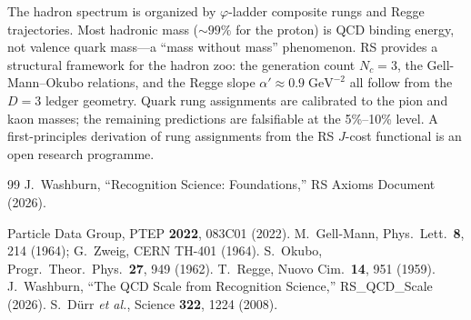 \documentclass[12pt,a4paper]{article}
\theoremstyle{definition}
\theoremstyle{remark}
\begin{document}
The hadron spectrum is organized by $\varphi$-ladder composite rungs
and Regge trajectories.  Most hadronic mass ($\sim 99\%$ for the
proton) is QCD binding energy, not valence quark mass---a ``mass
without mass'' phenomenon.  RS provides a structural framework for the
hadron zoo: the generation count $N_c = 3$, the Gell-Mann--Okubo
relations, and the Regge slope $\alpha' \approx 0.9\;\mathrm{GeV}^{-2}$
all follow from the $D = 3$ ledger geometry.  Quark rung assignments
are calibrated to the pion and kaon masses; the remaining predictions
are falsifiable at the 5\%--10\% level.  A first-principles derivation
of rung assignments from the RS $J$-cost functional is an open
research programme.

\begin{thebibliography}{99}
J.~Washburn, ``Recognition Science: Foundations,''
RS Axioms Document (2026).

 Particle Data Group, PTEP \textbf{2022}, 083C01 (2022).
 M.~Gell-Mann, Phys.\ Lett.\ \textbf{8}, 214 (1964); G.~Zweig, CERN TH-401 (1964).
 S.~Okubo, Progr.\ Theor.\ Phys.\ \textbf{27}, 949 (1962).
 T.~Regge, Nuovo Cim.\ \textbf{14}, 951 (1959).
 J.~Washburn, ``The QCD Scale from Recognition Science,'' RS\_QCD\_Scale (2026).
 S.~Dürr \textit{et al.}, Science \textbf{322}, 1224 (2008).
\end{thebibliography}
\end{document}
